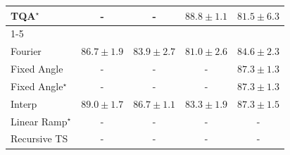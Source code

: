 \begin{tabular}{l|cccc|}
TQA$^\star$ & {\cellcolor[HTML]{000000}} \color[HTML]{F1F1F1} {\cellcolor{white}} \color{black} - & {\cellcolor[HTML]{000000}} \color[HTML]{F1F1F1} {\cellcolor{white}} \color{black} - & {\cellcolor[HTML]{963304}} \color[HTML]{F1F1F1} $88.8\pm 1.1$ & {\cellcolor[HTML]{F4811D}} \color[HTML]{F1F1F1} $81.5\pm 6.3$ \\
\cline{1-5}
\multicolumn{5}{c}{\rule{0pt}{8pt}PP} \\
\midrule
Fourier & {\cellcolor[HTML]{177B3F}} \color[HTML]{F1F1F1} $86.7\pm 1.9$ & {\cellcolor[HTML]{359C53}} \color[HTML]{F1F1F1} $83.9\pm 2.7$ & {\cellcolor[HTML]{61BB6D}} \color[HTML]{F1F1F1} $81.0\pm 2.6$ & {\cellcolor[HTML]{2E924C}} \color[HTML]{F1F1F1} $84.6\pm 2.3$ \\
Fixed Angle & {\cellcolor[HTML]{000000}} \color[HTML]{F1F1F1} {\cellcolor{white}} \color{black} - & {\cellcolor[HTML]{000000}} \color[HTML]{F1F1F1} {\cellcolor{white}} \color{black} - & {\cellcolor[HTML]{000000}} \color[HTML]{F1F1F1} {\cellcolor{white}} \color{black} - & {\cellcolor[HTML]{10743C}} \color[HTML]{F1F1F1} $87.3\pm 1.3$ \\
Fixed Angle$^\star$ & {\cellcolor[HTML]{000000}} \color[HTML]{F1F1F1} {\cellcolor{white}} \color{black} - & {\cellcolor[HTML]{000000}} \color[HTML]{F1F1F1} {\cellcolor{white}} \color{black} - & {\cellcolor[HTML]{000000}} \color[HTML]{F1F1F1} {\cellcolor{white}} \color{black} - & {\cellcolor[HTML]{10743C}} \color[HTML]{F1F1F1} $87.3\pm 1.3$ \\
Interp & {\cellcolor[HTML]{006435}} \color[HTML]{F1F1F1} $89.0\pm 1.7$ & {\cellcolor[HTML]{177B3F}} \color[HTML]{F1F1F1} $86.7\pm 1.1$ & {\cellcolor[HTML]{3CA458}} \color[HTML]{F1F1F1} $83.3\pm 1.9$ & {\cellcolor[HTML]{10743C}} \color[HTML]{F1F1F1} $87.3\pm 1.5$ \\
Linear Ramp$^\star$ & {\cellcolor[HTML]{000000}} \color[HTML]{F1F1F1} {\cellcolor{white}} \color{black} - & {\cellcolor[HTML]{000000}} \color[HTML]{F1F1F1} {\cellcolor{white}} \color{black} - & {\cellcolor[HTML]{000000}} \color[HTML]{F1F1F1} {\cellcolor{white}} \color{black} - & {\cellcolor[HTML]{000000}} \color[HTML]{F1F1F1} {\cellcolor{white}} \color{black} - \\
Recursive TS & {\cellcolor[HTML]{000000}} \color[HTML]{F1F1F1} {\cellcolor{white}} \color{black} - & {\cellcolor[HTML]{000000}} \color[HTML]{F1F1F1} {\cellcolor{white}} \color{black} - & {\cellcolor[HTML]{000000}} \color[HTML]{F1F1F1} {\cellcolor{white}} \color{black} - & {\cellcolor[HTML]{000000}} \color[HTML]{F1F1F1} {\cellcolor{white}} \color{black} - \\

\end{tabular}
